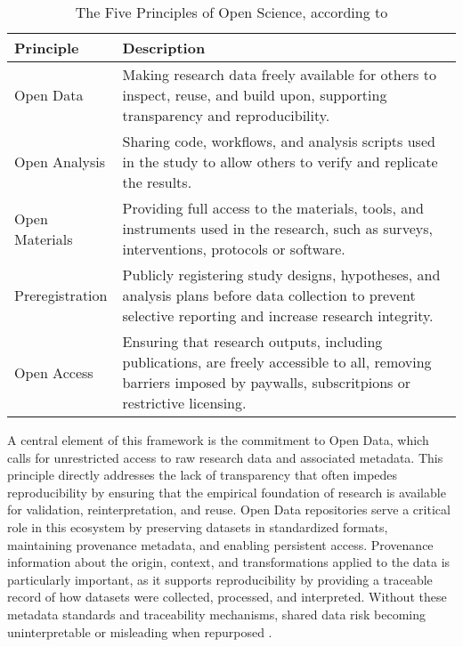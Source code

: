 \documentclass{article}
\begin{document}
\begin{table}[ht]
    \centering
    \caption{The Five Principles of Open Science, according to \cite{van_dijk_open_2021}}
    \label{tab:open_science_principles}
    \begin{tabular}{|l|p{11cm}|}
        \hline
        \textbf{Principle} & \textbf{Description}                                                                                                                                                 \\
        \hline
        Open Data          & Making research data freely available for others to inspect, reuse, and build upon, supporting transparency and reproducibility.                                     \\
        \hline
        Open Analysis      & Sharing code, workflows, and analysis scripts used in the study to allow others to verify and replicate the results.                                                 \\
        \hline
        Open Materials     & Providing full access to the materials, tools, and instruments used in the research, such as surveys, interventions, protocols or software.                          \\
        \hline
        Preregistration    & Publicly registering study designs, hypotheses, and analysis plans before data collection to prevent selective reporting and increase research integrity.            \\
        \hline
        Open Access        & Ensuring that research outputs, including publications, are freely accessible to all, removing barriers imposed by paywalls, subscritpions or restrictive licensing. \\
        \hline
    \end{tabular}
\end{table}

A central element of this framework is the commitment to Open Data, which calls for unrestricted access to raw research data and associated metadata. This principle directly addresses the lack of transparency that often impedes reproducibility by ensuring that the empirical foundation of research is available for validation, reinterpretation, and reuse. Open Data repositories serve a critical role in this ecosystem by preserving datasets in standardized formats, maintaining provenance metadata, and enabling persistent access. Provenance information about the origin, context, and transformations applied to the data is particularly important, as it supports reproducibility by providing a traceable record of how datasets were collected, processed, and interpreted. Without these metadata standards and traceability mechanisms, shared data risk becoming uninterpretable or misleading when repurposed \cite{learn_2017, burgelman_open_2019}.
\end{document}
